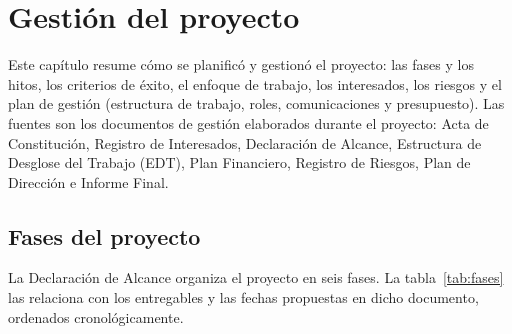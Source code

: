 \chapter{Gestión del proyecto}\label{cap:gestion}

Este capítulo resume cómo se planificó y gestionó el proyecto: las fases y los hitos, los criterios de éxito, el enfoque de trabajo, los interesados, los riesgos y el plan de gestión (estructura de trabajo, roles, comunicaciones y presupuesto). Las fuentes son los documentos de gestión elaborados durante el proyecto: Acta de Constitución, Registro de Interesados, Declaración de Alcance, Estructura de Desglose del Trabajo (EDT), Plan Financiero, Registro de Riesgos, Plan de Dirección e Informe Final.

\section{Fases del proyecto}

La Declaración de Alcance organiza el proyecto en seis fases. La tabla~\ref{tab:fases} las relaciona con los entregables y las fechas propuestas en dicho documento, ordenados cronológicamente.

